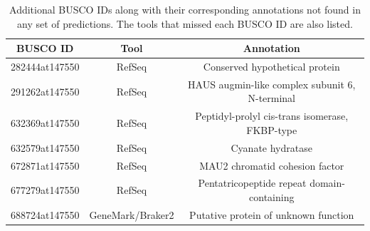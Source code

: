 \begin{table}[h]
  \centering
  \begin{tabular}{|c|c|c|}
    \hline
    BUSCO ID & Tool & Annotation \\ \hline
    282444at147550 & RefSeq & Conserved hypothetical protein \\ \hline
    291262at147550 & RefSeq & HAUS augmin-like complex subunit 6, N-terminal \\ \hline
    632369at147550 & RefSeq & Peptidyl-prolyl cis-trans isomerase, FKBP-type \\ \hline
    632579at147550 & RefSeq & Cyanate hydratase \\ \hline
    672871at147550 & RefSeq & MAU2 chromatid cohesion factor \\ \hline
    677279at147550 & RefSeq & Pentatricopeptide repeat domain-containing \\ \hline
    688724at147550 & GeneMark/Braker2 & Putative protein of unknown function \\ \hline
  \end{tabular}
  \caption{Additional BUSCO IDs along with their corresponding annotations not found in any set of predictions. The tools that missed each BUSCO ID are also listed.}
  \label{table:missed-all-gf}
\end{table}

